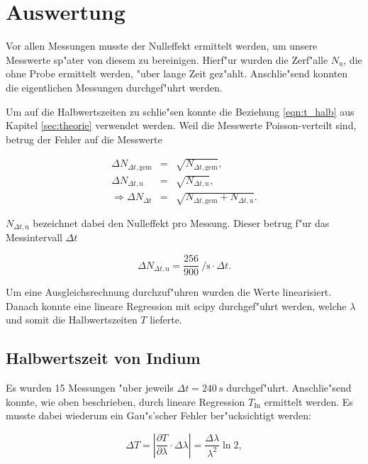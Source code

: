 \section{Auswertung}
	\label{sec:auswertung}
	Vor allen Messungen musste der Nulleffekt ermittelt werden, um unsere Messwerte sp"ater von diesem zu bereinigen.
	Hierf"ur wurden die Zerf"alle $N_{\mathrm{u}}$, die ohne Probe ermittelt werden, "uber lange Zeit gez"ahlt.
	Anschlie"send konnten die eigentlichen Messungen durch\-ge\-f"uhrt werden.
	

	Um auf die Halbwertszeiten zu schlie"sen konnte die Beziehung \eqref{eqn:t_halb} aus Kapitel \ref{sec:theorie} ver\-wen\-det werden.
	Weil die Messwerte Poisson-verteilt sind, betrug der Fehler auf die Messwerte

	\begin{eqnarray*}
		\Delta N_{\Delta t, \mathrm{gem}} & = & \sqrt{N_{\Delta t, \mathrm{gem}}}, \\
		\Delta N_{\Delta t, \mathrm{u}} & = & \sqrt{N_{\Delta t, \mathrm{u}}},\\
		\Rightarrow \Delta N_{\Delta t} & = & \sqrt{N_{\Delta t, \mathrm{gem}} + N_{\Delta t, \mathrm{u}}} .
	\end{eqnarray*}

	$N_{\Delta t, \mathrm{u}}$ bezeichnet dabei den Nulleffekt pro Messung. Dieser betrug f"ur das Messintervall $\Delta t$

	\begin{equation*}
		\Delta N_{\Delta t, \mathrm{u}} = \frac{256}{900} \SI{}{\per \second} \cdot \Delta t .
	\end{equation*}

	Um eine Ausgleichsrechnung durch\-zu\-f"uh\-ren wurden die Werte linearisiert.
	Danach konnte eine lineare Regression mit scipy durchgef"uhrt werden, welche $\lambda$ und somit die Halb\-werts\-zei\-ten $T$ lieferte.

	\subsection{Halbwertszeit von Indium}
		\label{subsec:indium}
		Es wurden 15 Messungen "uber jeweils $\Delta t = \SI{240}{\second}$ durchgef"uhrt.
		Anschlie"send konnte, wie oben beschrieben, durch lineare Regression $T_\mathrm{In}$ ermittelt werden. Es musste dabei wiederum ein Gau"s'scher Fehler ber"ucksichtigt werden:

		\begin{displaymath}
			\Delta T = \left|\frac{\partial T}{\partial \lambda} \cdot \Delta \lambda \right| = \frac{\Delta \lambda}{\lambda^2} \ln{2} ,
		\end{displaymath}

